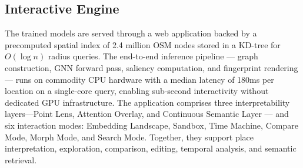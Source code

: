 \documentclass[]{interact}
\theoremstyle{plain}%
\theoremstyle{definition}
\theoremstyle{remark}
\begin{document}
\subsection{Interactive Engine}
\label{sec:system}

The trained models are served through a web application backed by a precomputed spatial index of 2.4 million OSM nodes stored in a KD-tree for $O(\log n)$ radius queries. The end-to-end inference pipeline --- graph construction, GNN forward pass, saliency computation, and fingerprint rendering --- runs on commodity CPU hardware with a median latency of 180ms per location on a single-core query, enabling sub-second interactivity without dedicated GPU infrastructure. 
The application comprises three interpretability layers—Point Lens, Attention Overlay, and Continuous Semantic Layer --- and six interaction modes: Embedding Landscape, Sandbox, Time Machine, Compare Mode, Morph Mode, and Search Mode. Together, they support place interpretation, exploration, comparison, editing, temporal analysis, and semantic retrieval.

\end{document}
